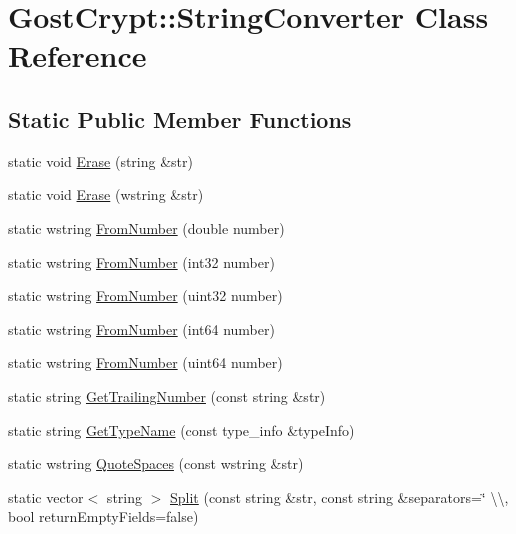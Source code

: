 \hypertarget{class_gost_crypt_1_1_string_converter}{}\section{Gost\+Crypt\+:\+:String\+Converter Class Reference}
\label{class_gost_crypt_1_1_string_converter}
\subsection*{Static Public Member Functions}
\begin{DoxyCompactItemize}
\item 
static void \hyperlink{class_gost_crypt_1_1_string_converter_ac5fac70dd45743a6bea8b1a1025a5e2d}{Erase} (string \&str)
\item 
static void \hyperlink{class_gost_crypt_1_1_string_converter_a6037e1542308e7d01ddfc048edc0df35}{Erase} (wstring \&str)
\item 
static wstring \hyperlink{class_gost_crypt_1_1_string_converter_af2aafa018883a06911693cfa6cf051ee}{From\+Number} (double number)
\item 
static wstring \hyperlink{class_gost_crypt_1_1_string_converter_a4da6015d49ba8bd6d5b781168deae166}{From\+Number} (int32 number)
\item 
static wstring \hyperlink{class_gost_crypt_1_1_string_converter_aca86ecb3415db8026c585662c2c86540}{From\+Number} (uint32 number)
\item 
static wstring \hyperlink{class_gost_crypt_1_1_string_converter_aa3baa25ce83f48273ae27b3943ceb4b1}{From\+Number} (int64 number)
\item 
static wstring \hyperlink{class_gost_crypt_1_1_string_converter_ab2f8b1c6a29c7c6a235cfc8828e1b7db}{From\+Number} (uint64 number)
\item 
static string \hyperlink{class_gost_crypt_1_1_string_converter_a90ae47fd725ce6960c4a93ae79a89806}{Get\+Trailing\+Number} (const string \&str)
\item 
static string \hyperlink{class_gost_crypt_1_1_string_converter_a8f57ff107fac8c923470014d26b9681b}{Get\+Type\+Name} (const type\+\_\+info \&type\+Info)
\item 
static wstring \hyperlink{class_gost_crypt_1_1_string_converter_a1dc1f215db66d2a4bb4d0b907513934f}{Quote\+Spaces} (const wstring \&str)
\item 
static vector$<$ string $>$ \hyperlink{class_gost_crypt_1_1_string_converter_a4e488a929da871d20de099fcc48e90f7}{Split} (const string \&str, const string \&separators=\char`\"{} \textbackslash{}\textbackslash{}, bool return\+Empty\+Fields=false)

\end{DoxyCompactItemize}
